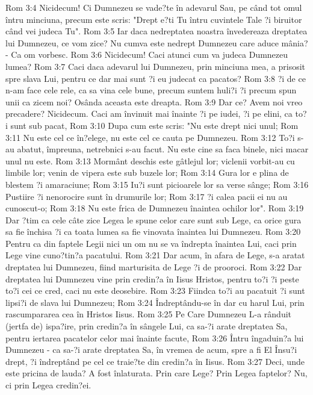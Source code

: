 Rom 3:4  Nicidecum! Ci Dumnezeu se vade?te în adevarul Sau, pe când tot omul întru minciuna, precum este scris: "Drept e?ti Tu întru cuvintele Tale ?i biruitor când vei judeca Tu".
Rom 3:5  Iar daca nedreptatea noastra învedereaza dreptatea lui Dumnezeu, ce vom zice? Nu cumva este nedrept Dumnezeu care aduce mânia? - Ca om vorbesc.
Rom 3:6  Nicidecum! Caci atunci cum va judeca Dumnezeu lumea?
Rom 3:7  Caci daca adevarul lui Dumnezeu, prin minciuna mea, a prisosit spre slava Lui, pentru ce dar mai sunt ?i eu judecat ca pacatos?
Rom 3:8  ?i de ce n-am face cele rele, ca sa vina cele bune, precum suntem huli?i ?i precum spun unii ca zicem noi? Osânda aceasta este dreapta.
Rom 3:9  Dar ce? Avem noi vreo precadere? Nicidecum. Caci am învinuit mai înainte ?i pe iudei, ?i pe elini, ca to?i sunt sub pacat,
Rom 3:10  Dupa cum este scris: "Nu este drept nici unul;
Rom 3:11  Nu este cel ce în?elege, nu este cel ce cauta pe Dumnezeu.
Rom 3:12  To?i s-au abatut, împreuna, netrebnici s-au facut. Nu este cine sa faca binele, nici macar unul nu este.
Rom 3:13  Mormânt deschis este gâtlejul lor; viclenii vorbit-au cu limbile lor; venin de vipera este sub buzele lor;
Rom 3:14  Gura lor e plina de blestem ?i amaraciune;
Rom 3:15  Iu?i sunt picioarele lor sa verse sânge;
Rom 3:16  Pustiire ?i nenorocire sunt în drumurile lor;
Rom 3:17  ?i calea pacii ei nu au cunoscut-o;
Rom 3:18  Nu este frica de Dumnezeu înaintea ochilor lor".
Rom 3:19  Dar ?tim ca cele câte zice Legea le spune celor care sunt sub Lege, ca orice gura sa fie închisa ?i ca toata lumea sa fie vinovata înaintea lui Dumnezeu.
Rom 3:20  Pentru ca din faptele Legii nici un om nu se va îndrepta înaintea Lui, caci prin Lege vine cuno?tin?a pacatului.
Rom 3:21  Dar acum, în afara de Lege, s-a aratat dreptatea lui Dumnezeu, fiind marturisita de Lege ?i de prooroci.
Rom 3:22  Dar dreptatea lui Dumnezeu vine prin credin?a în Iisus Hristos, pentru to?i ?i peste to?i cei ce cred, caci nu este deosebire.
Rom 3:23  Fiindca to?i au pacatuit ?i sunt lipsi?i de slava lui Dumnezeu;
Rom 3:24  Îndreptându-se în dar cu harul Lui, prin rascumpararea cea în Hristos Iisus.
Rom 3:25  Pe Care Dumnezeu L-a rânduit (jertfa de) ispa?ire, prin credin?a în sângele Lui, ca sa-?i arate dreptatea Sa, pentru iertarea pacatelor celor mai înainte facute,
Rom 3:26  Întru îngaduin?a lui Dumnezeu - ca sa-?i arate dreptatea Sa, în vremea de acum, spre a fi El Însu?i drept, ?i îndreptând pe cel ce traie?te din credin?a în Iisus.
Rom 3:27  Deci, unde este pricina de lauda? A fost înlaturata. Prin care Lege? Prin Legea faptelor? Nu, ci prin Legea credin?ei.
